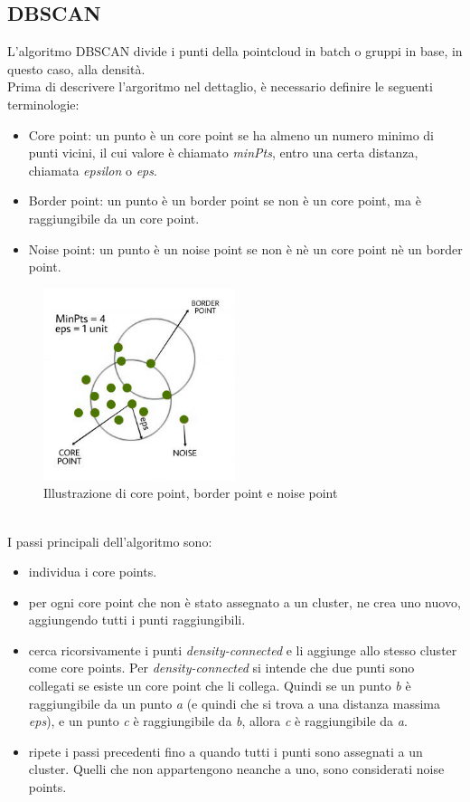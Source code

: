 \documentclass[italian]{report}
\begin{document}
\subsection{DBSCAN}
L'algoritmo DBSCAN divide i punti della pointcloud in batch o gruppi in base, in questo caso, alla densità.\\
Prima di descrivere l'argoritmo nel dettaglio, è necessario definire le seguenti terminologie:
\begin{itemize}
	\item Core point: un punto è un core point se ha almeno un numero minimo di punti vicini, il cui valore è chiamato \textit{minPts}, entro una certa distanza, chiamata \textit{epsilon} o \textit{eps}.
	\item Border point: un punto è un border point se non è un core point, ma è raggiungibile da un core point.
	\item Noise point: un punto è un noise point se non è nè un core point nè un border point.
\end{itemize}
\begin{figure}[H]
	\centering
	\includegraphics[width=0.5\textwidth]{clustering}
	\footnotesize
	\caption{Illustrazione di core point, border point e noise point}
\end{figure}\\
I passi principali dell'algoritmo sono:
\begin{itemize}
	\item individua i core points.
	\item per ogni core point che non è stato assegnato a un cluster, ne crea uno nuovo, aggiungendo tutti i punti raggiungibili.
	\item cerca ricorsivamente i punti \textit{density-connected} e li aggiunge allo stesso cluster come core points. Per \textit{density-connected} si intende che due punti sono collegati se esiste un core point che li collega.		Quindi se un punto \textit{b} è raggiungibile da un punto \textit{a} (e quindi che si trova a una distanza massima \textit{eps}), e un punto \textit{c} è raggiungibile da \textit{b}, allora \textit{c} è raggiungibile da \textit{a}.
	\item ripete i passi precedenti fino a quando tutti i punti sono assegnati a un cluster. Quelli che non appartengono neanche a uno, sono considerati noise points.
\end{itemize}
\end{document}
